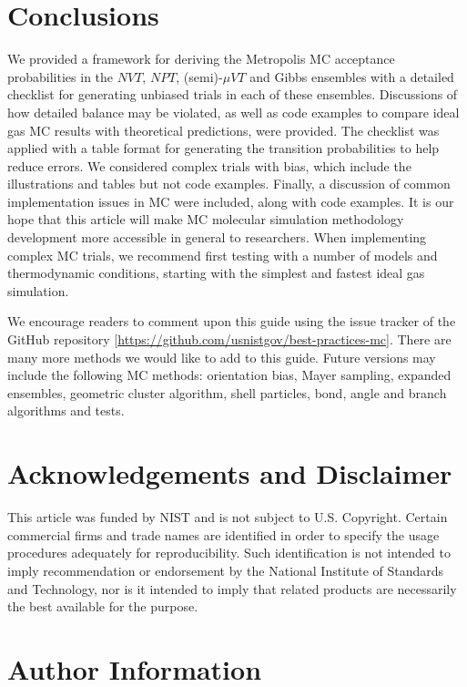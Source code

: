 \documentclass[
  9pt,
  bestpractices,
]{livecoms}
\begin{document}
\section{\label{sec:conc}Conclusions}

We provided a framework for deriving the Metropolis MC acceptance probabilities in the $NVT$, $NPT$, (semi)-$\mu VT$ and Gibbs ensembles with a detailed checklist for generating unbiased trials in each of these ensembles.
Discussions of how detailed balance may be violated, as well as code examples to compare ideal gas MC results with theoretical predictions, were provided.
The checklist was applied with a table format for generating the transition probabilities to help reduce errors.
We considered complex trials with bias, which include the illustrations and tables but not code examples.
Finally, a discussion of common implementation issues in MC were included, along with code examples.
It is our hope that this article will make MC molecular simulation methodology development more accessible in general to researchers.
When implementing complex MC trials, we recommend first testing with a number of models and thermodynamic conditions, starting with the simplest and fastest ideal gas simulation.

We encourage readers to comment upon this guide using the issue tracker of the GitHub repository [\url{https://github.com/usnistgov/best-practices-mc}].
There are many more methods we would like to add to this guide.
Future versions may include the following MC methods: orientation bias, Mayer sampling, expanded ensembles, geometric cluster algorithm, shell particles, bond, angle and branch algorithms and tests.

\section{\label{sec:ack}Acknowledgements and Disclaimer}

This article was funded by NIST and is not subject to U.S. Copyright.
Certain commercial firms and trade names are identified in order to specify the usage procedures adequately for reproducibility.
Such identification is not intended to imply recommendation or endorsement by the National Institute of Standards and Technology, nor is it intended to imply that related products are necessarily the best available for the purpose.

\section*{Author Information}
\makeorcid

\nocite{*}

\end{document}
